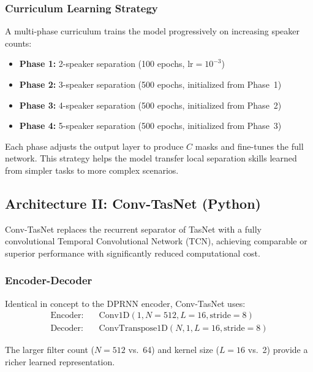 \documentclass[conference]{IEEEtran}
\begin{document}
\subsubsection{Curriculum Learning Strategy}

A multi-phase curriculum trains the model progressively on increasing speaker counts:
\begin{itemize}[leftmargin=*,nosep]
    \item \textbf{Phase 1:} 2-speaker separation (100 epochs, $\text{lr} = 10^{-3}$)
    \item \textbf{Phase 2:} 3-speaker separation (500 epochs, initialized from Phase~1)
    \item \textbf{Phase 3:} 4-speaker separation (500 epochs, initialized from Phase~2)
    \item \textbf{Phase 4:} 5-speaker separation (500 epochs, initialized from Phase~3)
\end{itemize}

Each phase adjusts the output layer to produce $C$ masks and fine-tunes the full network. This strategy helps the model transfer local separation skills learned from simpler tasks to more complex scenarios.

\subsection{Architecture II: Conv-TasNet (Python)}
\label{sec:convtasnet}

Conv-TasNet replaces the recurrent separator of TasNet with a fully convolutional Temporal Convolutional Network (TCN), achieving comparable or superior performance with significantly reduced computational cost.

\subsubsection{Encoder-Decoder}

Identical in concept to the DPRNN encoder, Conv-TasNet uses:
\begin{align}
\text{Encoder:} &\quad \text{Conv1D}(1, N{=}512, L{=}16, \text{stride}{=}8) \\
\text{Decoder:} &\quad \text{ConvTranspose1D}(N, 1, L{=}16, \text{stride}{=}8)
\end{align}

The larger filter count ($N = 512$ vs.\ 64) and kernel size ($L = 16$ vs.\ 2) provide a richer learned representation.
\end{document}
